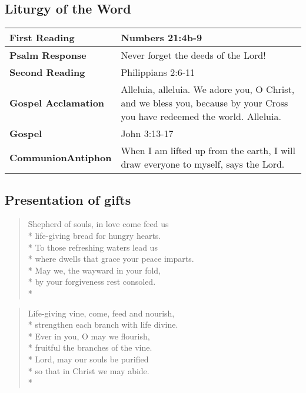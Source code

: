 \documentclass[12pt]{article}
\newcounter{count}
\newcommand\printcount{\addtocounter{count}{1}\thecount}
\begin{document}
\begin{center}
\subsection*{Liturgy of the Word}
\begin{tabular}{ |p{}|p{}| }
\hline\textbf{First Reading} & Numbers 21:4b-9\\
\hline
\textbf{Psalm Response} & Never forget the deeds of the Lord!\\
\hline
\textbf{Second Reading} & Philippians 2:6-11\\
\hline
\textbf{Gospel Acclamation} & Alleluia, alleluia. We adore you, O Christ, and we bless you, because by your Cross you have redeemed the world. Alleluia.\\
\hline
\textbf{Gospel} & John 3:13-17\\
\hline
\textbf{Communion\newline Antiphon} & When I am lifted up from the earth, I will draw everyone to myself, says the Lord.\\
\hline
\end{tabular}\end{center}\begin{center}
\subsection*{Presentation of gifts}
\end{center}
\begin{multicols}{2}
\setcounter{count}{0}
\setcounter{count}{0}
\begin{verse}
\flagverse{\printcount.} Shepherd of souls, in love come feed us\\*
life-giving bread for hungry hearts.\\*
To those refreshing waters lead us\\*
where dwells that grace your peace imparts.\\*
May we, the wayward in your fold,\\*
by your forgiveness rest consoled.\\*
\end{verse}

\begin{verse}
\flagverse{\printcount.} Life-giving vine, come, feed and nourish,\\*
strengthen each branch with life divine.\\*
Ever in you, O may we flourish,\\*
fruitful the branches of the vine.\\*
Lord, may our souls be purified\\*
so that in Christ we may abide.\\*
\end{verse}
\end{multicols}
\end{document}
